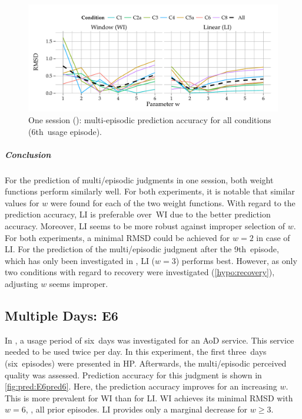 \begin{figure}[h]
	\centering
\begin{knitrout}
\color{fgcolor}
\includegraphics[width=\maxwidth]{figure/plotE2PRED-1} 

\end{knitrout}
 
	\caption[One session (\EIIa{}): multi-episodic prediction accuracy for the 6th~usage episode]{One session (\EIIa{}): multi-episodic prediction accuracy for all conditions (6th~usage episode).}
	\label{fig:pred:E2pred6}
\end{figure}

\subparagraph*{Conclusion}
For the prediction of multi\-/episodic judgments in one session, both weight functions perform similarly well.
For both experiments, it is notable that similar values for $\mathit{w}$ were found for each of the two weight functions.
With regard to the prediction accuracy, LI is preferable over~WI due to the better prediction accuracy.
Moreover, LI seems to be more robust against improper selection of $\mathit{w}$.
For both experiments, a minimal \ac{RMSD} could be achieved for $\mathit{w}=2$ in case of LI.
For the prediction of the multi\-/episodic judgment after the 9th~episode, which has only been investigated in , LI ($\mathit{w}=3$) performs best. 
However, as only two conditions with regard to recovery were investigated (\autoref{hypo:recovery}), adjusting $\mathit{w}$ seems improper.

\subsection{Multiple Days: E6}
In , a usage period of six~days was investigated for an \ac{AoD} service.
This service needed to be  used twice per day.
In this experiment, the first three~days (six~episodes) were presented in \ac{HP}.
Afterwards, the multi\-/episodic perceived quality was assessed.
Prediction accuracy for this judgment is shown in \autoref{fig:pred:E6pred6}.
Here, the prediction accuracy improves for an increasing $\mathit{w}$.
This is more prevalent for WI than for LI.
WI achieves its minimal \ac{RMSD} with $\mathit{w}=6$, \ie, all prior episodes.
LI provides only a marginal decrease for $\mathit{w} \geq 3$.


